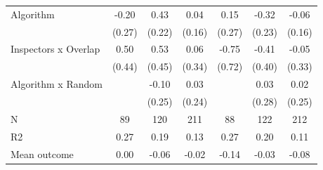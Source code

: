 \begin{tabular}{lccc|ccc}
Algorithm   &       -0.20         &        0.43\sym{*}  &        0.04         &        0.15         &       -0.32         &       -0.06         \\
            &      (0.27)         &      (0.22)         &      (0.16)         &      (0.27)         &      (0.23)         &      (0.16)         \\
\addlinespace
Inspectors x Overlap&        0.50         &        0.53         &        0.06         &       -0.75         &       -0.41         &       -0.05         \\
            &      (0.44)         &      (0.45)         &      (0.34)         &      (0.72)         &      (0.40)         &      (0.33)         \\
\addlinespace
Algorithm x Random&                     &       -0.10         &        0.03         &                     &        0.03         &        0.02         \\
            &                     &      (0.25)         &      (0.24)         &                     &      (0.28)         &      (0.25)         \\
\midrule
N           &          89         &         120         &         211         &          88         &         122         &         212         \\
R2          &        0.27         &        0.19         &        0.13         &        0.27         &        0.20         &        0.11         \\
Mean outcome&        0.00         &       -0.06         &       -0.02         &       -0.14         &       -0.03         &       -0.08         \\
\bottomrule \end{tabular}
